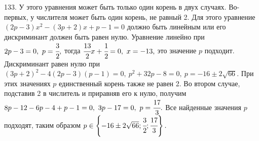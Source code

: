 133. У этого уравнения может быть только один корень в двух случаях. Во-первых, у числителя может быть один корень, не равный 2. Для этого уравнение $(2p-3)x^2-(3p+2)x+p-1=0$ должно быть линейным или его дискриминант должен быть равен нулю. Уравнение линейно при $2p-3=0,\ p=\cfrac{3}{2},$ тогда $\cfrac{13}{2}x+\cfrac{1}{2}=0,\ x=-13,$ это значение $p$ подходит. Дискриминант равен нулю при $(3p+2)^2-4(2p-3)(p-1)=0,\ p^2+32p-8=0,\ p=-16\pm2\sqrt{66}.$ При этих значениях $p$ единственный корень также не равен 2. Во втором случае, подставив 2 в числитель и приравняв его к нулю, получим $8p-12-6p-4+p-1=0,\ 3p-17=0,\ p=\cfrac{17}{3}.$ Все найденные значения $p$ подходят, таким образом $p\in\left\{-16\pm2\sqrt{66};\cfrac{3}{2};\cfrac{17}{3}\right\}.$\\
